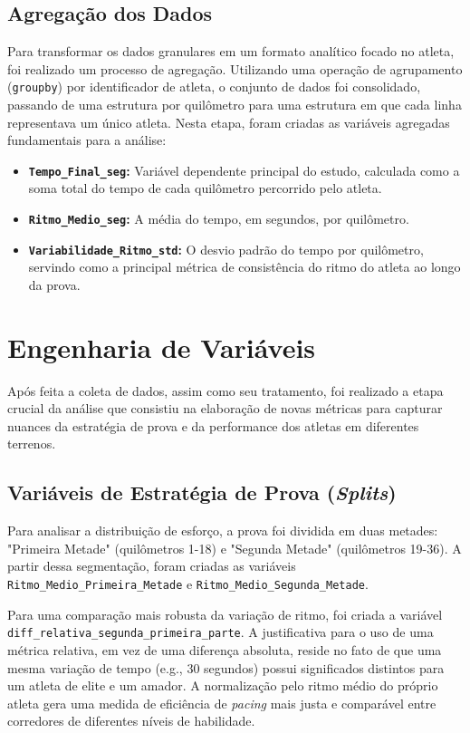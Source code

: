 \subsection{Agregação dos Dados}
\label{sec:preprocessamento}

Para transformar os dados granulares em um formato analítico focado no atleta, foi realizado um processo de agregação. Utilizando uma operação de agrupamento (\texttt{groupby}) por identificador de atleta, o conjunto de dados foi consolidado, passando de uma estrutura por quilômetro para uma estrutura em que cada linha representava um único atleta. Nesta etapa, foram criadas as variáveis agregadas fundamentais para a análise:
\begin{itemize}
    \item \textbf{\texttt{Tempo\_Final\_seg}:} Variável dependente principal do estudo, calculada como a soma total do tempo de cada quilômetro percorrido pelo atleta.
    \item \textbf{\texttt{Ritmo\_Medio\_seg}:} A média do tempo, em segundos, por quilômetro.
    \item \textbf{\texttt{Variabilidade\_Ritmo\_std}:} O desvio padrão do tempo por quilômetro, servindo como a principal métrica de consistência do ritmo do atleta ao longo da prova.
\end{itemize}

\section{Engenharia de Variáveis}
\label{sec:engenharia_variaveis_final}

Após feita a coleta de dados, assim como seu tratamento, foi realizado a etapa crucial da análise que consistiu na elaboração de novas métricas para capturar nuances da estratégia de prova e da performance dos atletas em diferentes terrenos. 

\subsection{Variáveis de Estratégia de Prova (\textit{Splits})}

Para analisar a distribuição de esforço, a prova foi dividida em duas metades: "Primeira Metade" (quilômetros 1-18) e "Segunda Metade" (quilômetros 19-36). A partir dessa segmentação, foram criadas as variáveis \texttt{Ritmo\_Medio\_Primeira\_Metade} e \texttt{Ritmo\_Medio\_Segunda\_Metade}.

Para uma comparação mais robusta da variação de ritmo, foi criada a variável \texttt{diff\_relativa\_segunda\_primeira\_parte}. A justificativa para o uso de uma métrica relativa, em vez de uma diferença absoluta, reside no fato de que uma mesma variação de tempo (e.g., 30 segundos) possui significados distintos para um atleta de elite e um amador. A normalização pelo ritmo médio do próprio atleta gera uma medida de eficiência de \emph{pacing} mais justa e comparável entre corredores de diferentes níveis de habilidade.

